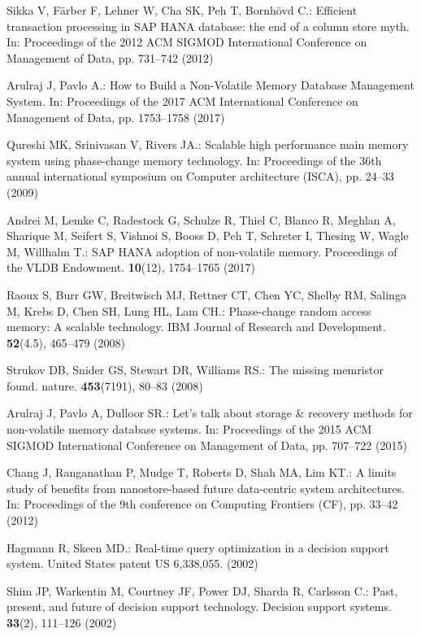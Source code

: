 Sikka V, F\"{a}rber F, Lehner W, Cha SK, Peh T, Bornh\"{o}vd C.: Efficient transaction processing in SAP HANA database: the end of a column store myth. In: Proceedings of the 2012 ACM SIGMOD International Conference on Management of Data, pp. 731--742 (2012)

Arulraj J, Pavlo A.: How to Build a Non-Volatile Memory Database Management System. In: Proceedings of the 2017 ACM International Conference on Management of Data, pp. 1753--1758 (2017)

Qureshi MK, Srinivasan V, Rivers JA.: Scalable high performance main memory system using phase-change memory technology. In: Proceedings of the 36th annual international symposium on Computer architecture (ISCA), pp. 24--33 (2009)

Andrei M, Lemke C, Radestock G, Schulze R, Thiel C, Blanco R, Meghlan A, Sharique M, Seifert S, Vishnoi S, Booss D, Peh T, Schreter I, Thesing W, Wagle  M, Willhalm T.: SAP HANA adoption of non-volatile memory. Proceedings of the VLDB Endowment. \textbf{10}(12), 1754--1765 (2017)

Raoux S, Burr GW, Breitwisch MJ, Rettner CT, Chen YC, Shelby RM, Salinga M, Krebs D, Chen SH, Lung HL, Lam CH.: Phase-change random access memory: A scalable technology. IBM Journal of Research and Development. \textbf{52}(4.5), 465--479 (2008)

Strukov DB, Snider GS, Stewart DR, Williams RS.: The missing memristor found. nature. \textbf{453}(7191), 80--83 (2008)


Arulraj J, Pavlo A, Dulloor SR.: Let's talk about storage \& recovery methods for non-volatile memory database systems. In: Proceedings of the 2015 ACM SIGMOD International Conference on Management of Data, pp. 707--722 (2015)

Chang J, Ranganathan P, Mudge T, Roberts D, Shah MA, Lim KT.: A limits study of benefits from nanostore-based future data-centric system architectures. In: Proceedings of the 9th conference on Computing Frontiers (CF), pp. 33--42 (2012)

Hagmann R, Skeen MD.: Real-time query optimization in a decision support system. United States patent US 6,338,055. (2002)

Shim JP, Warkentin M, Courtney JF, Power DJ, Sharda R, Carlsson C.: Past, present, and future of decision support technology. Decision support systems. \textbf{33}(2), 111--126 (2002)

